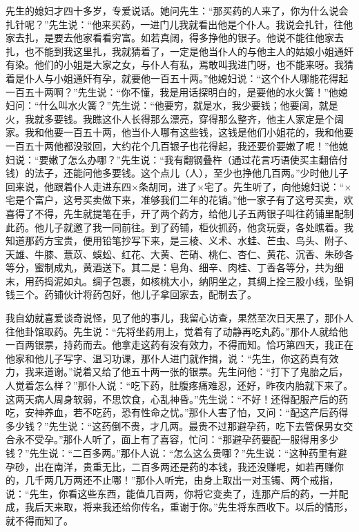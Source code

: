\documentclass[12pt,UTF8]{ctexbook}
\begin{document}
先生的媳妇才四十多岁，专爱说话。她问先生：“那买药的人来了，你为什么说会扎针呢？”先生说：“他来买药，一进门儿我就看出他是个仆人。我说会扎针，往他家去扎，是要去他家看看穷富。如若真阔，得多挣他的银子。他说不能往他家去扎，也不能到我这里扎，我就猜着了，一定是他当仆人的与他主人的姑娘小姐通奸有染。他们的小姐是大家之女，与仆人有私，焉敢叫我进门呀，也不能来呀。我猜着是仆人与小姐通奸有孕，就要他一百五十两。”他媳妇说：“这个仆人哪能花得起一百五十两啊？”先生说：“你不懂，我是用话探明白的，是要他的水火簧！”他媳妇问：“什么叫水火簧？”先生说：“他要穷，就是水，我少要钱；他要阔，就是火，我就多要钱。我瞧这仆人长得那么漂亮，穿得那么整齐，他主人家定是个阔家。我和他要一百五十两，他当仆人哪有这些钱，这钱是他们小姐花的，我和他要一百五十两他都没驳回，大约花个几百银子也花得起，我还要价要嫩了呢！”他媳妇说：“要嫩了怎么办哪？”先生说：“我有翻钢叠杵（通过花言巧语使买主翻倍付钱）的法子，还能问他多要钱。这个点儿（人），至少也挣他几百两。”少时他儿子回来说，他跟着仆人走进东四×条胡同，进了×宅了。先生听了，向他媳妇说：“×宅是个富户，这号买卖做下来，准够我们二年的花销。”他一家子有了这号买卖，欢喜得了不得，先生就提笔在手，开了两个药方，给他儿子五两银子叫往药铺里配制此药。他儿子就邀了我一同前往。到了药铺，柜伙抓药，他贪玩耍，各处瞧着。我知道那药方宝贵，便用铅笔抄写下来，是三棱、义术、水蛙、芒虫、鸟头、附子、天雄、牛膝、薏苡、蜈蚣、红花、大黄、芒硝、桃仁、杏仁、黄花、沉香、朱砂各等分，蜜制成丸，黄酒送下。其二是：皂角、细辛、肉桂、丁香各等分，共为细末，用药捣泥如丸。绸子包裹，如核桃大小，纳阴坐之，其绸上拴三股小线，坠铜钱三个。药铺伙计将药包好，他儿子拿回家去，配制去了。

我自幼就喜爱谈奇说怪，见了他的事儿，我留心访查，果然至次日天黑了，那仆人往他卦馆取药。先生说：“先将坐药用上，觉着有了动静再吃丸药。”那仆人就给他一百两银票，持药而去。他拿走这药有没有效力，不得而知。恰巧第四天，我正在他家和他儿子写字、温习功课，那仆人进门就作揖，说：“先生，你这药真有效力，我来道谢。”说着又给了他五十两一张的银票。先生问他：“打下了鬼胎之后，人觉着怎么样？”那仆人说：“吃下药，肚腹疼痛难忍，还好，昨夜内胎就下来了。这两天病人周身软弱，不思饮食，心乱神昏。”先生说：“不好！还得配服产后的药吃，安神养血，若不吃药，恐有性命之忧。”那仆人害了怕，又问：“配这产后药得多少钱？”先生说：“这药倒不贵，才几两。最贵不过那避孕药，吃下去管保男女交合永不受孕。”那仆人听了，面上有了喜容，忙问：“那避孕药要配一服得用多少钱？”先生说：“二百多两。”那仆人说：“怎么这么贵哪？”先生说：“这种药里有避孕砂，出在南洋，贵重无比，二百多两还是药的本钱，我还没赚呢，如若再赚你的，几千两几万两还不止哪！”那仆人听完，由身上取出一对玉镯、两个戒指，说：“先生，你看这些东西，能值几百两，你将它变卖了，连那产后的药，一并配成，我后天来取，将来我还给你传名，重谢于你。”先生将东西收下。以后的情形，就不得而知了。
\end{document}
